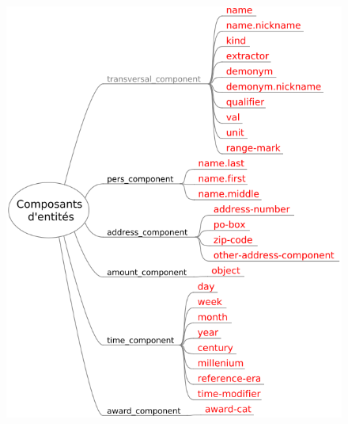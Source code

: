 \documentclass[citation\_needed]{subfiles}
\begin{document}
\begin{figure}[ht!]
\begin{minipage}{0.49\linewidth}
    \centering
    \includegraphics[scale=0.5]{images/quaero/annotation_guide-components}
\end{minipage}
\begin{minipage}{0.49\linewidth}
    \centering

\end{minipage}
\end{figure}
\end{document}

